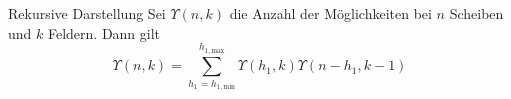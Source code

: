 \begin{frame}{Rekursive Darstellung}
    Sei $\Upsilon(n,k)$ die Anzahl der Möglichkeiten bei $n$ Scheiben und $k$ Feldern. Dann gilt
    \[\Upsilon(n,k) = \sum_{h_1 = h_{1,\mathrm{min}}}^{h_{1, \mathrm{max}}}\Upsilon(h_1,k)\Upsilon(n-h_1,k-1)\]
\end{frame}